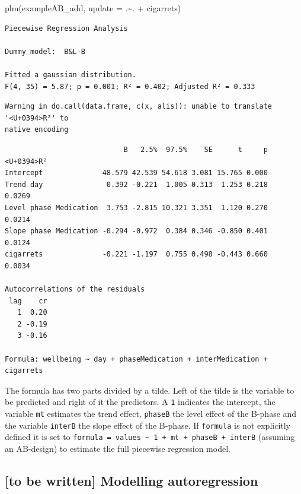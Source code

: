 \documentclass[
]{book}
\newenvironment{Shaded}{\begin{snugshade}}{\end{snugshade}}
\newcommand{\AttributeTok}[1]{\textcolor[rgb]{0.77,0.63,0.00}{#1}}
\newcommand{\FunctionTok}[1]{\textcolor[rgb]{0.00,0.00,0.00}{#1}}
\newcommand{\NormalTok}[1]{#1}
\newcommand{\SpecialCharTok}[1]{\textcolor[rgb]{0.00,0.00,0.00}{#1}}
\begin{document}
\begin{Shaded}
\begin{Highlighting}[]
\FunctionTok{plm}\NormalTok{(exampleAB\_add, }\AttributeTok{update =}\NormalTok{ .}\SpecialCharTok{\textasciitilde{}}\NormalTok{. }\SpecialCharTok{+}\NormalTok{ cigarrets)}
\end{Highlighting}
\end{Shaded}

\begin{verbatim}
Piecewise Regression Analysis

Dummy model:  B&L-B 

Fitted a gaussian distribution.
F(4, 35) = 5.87; p = 0.001; R² = 0.402; Adjusted R² = 0.333
\end{verbatim}

\begin{verbatim}
Warning in do.call(data.frame, c(x, alis)): unable to translate '<U+0394>R²' to
native encoding
\end{verbatim}

\begin{verbatim}
                            B   2.5%  97.5%    SE      t     p <U+0394>R²
Intercept              48.579 42.539 54.618 3.081 15.765 0.000           
Trend day               0.392 -0.221  1.005 0.313  1.253 0.218     0.0269
Level phase Medication  3.753 -2.815 10.321 3.351  1.120 0.270     0.0214
Slope phase Medication -0.294 -0.972  0.384 0.346 -0.850 0.401     0.0124
cigarrets              -0.221 -1.197  0.755 0.498 -0.443 0.660     0.0034

Autocorrelations of the residuals
 lag    cr
   1  0.20
   2 -0.19
   3 -0.16

Formula: wellbeing ~ day + phaseMedication + interMedication + cigarrets
\end{verbatim}

The formula has two parts divided by a tilde. Left of the tilde is the variable to be predicted and right of it the predictors. A \texttt{1} indicates the intercept, the variable \texttt{mt} estimates the trend effect, \texttt{phaseB} the level effect of the B-phase and the variable \texttt{interB} the slope effect of the B-phase. If \texttt{formula} is not explicitly defined it is set to \texttt{formula\ =\ values\ \textasciitilde{}\ 1\ +\ mt\ +\ phaseB\ +\ interB} (assuming an AB-design) to estimate the full piecewise regression model.

\hypertarget{to-be-written-modelling-autoregression}{%
\subsection{{[}to be written{]} Modelling autoregression}\label{to-be-written-modelling-autoregression}}
\end{document}
